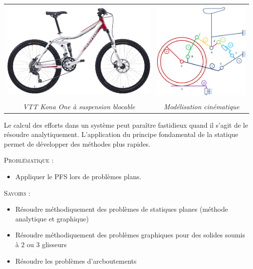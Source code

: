 \documentclass[11pt,oneside]{article}
\begin{document}
\begin{center}
\begin{tabular}{cc}
\includegraphics[height=5cm]{png/vtt1} &
\includegraphics[height=5cm]{png/vtt2} \\
\textit{VTT Kona One à suspension blocable \cite{vtt}} & \textit{Modélisation cinématique}\\
\end{tabular}
\end{center}

\vspace{.2cm}
Le calcul des efforts dans un système peut paraître fastidieux quand il s'agit de le résoudre analytiquement. L'application du principe fondamental de la statique permet de développer des méthodes plus rapides. 

\begin{prob}
\textsc{Problématique :}
\begin{itemize}
\item Appliquer le PFS lors de problèmes plans.
\end{itemize}
\end{prob}

\begin{savoir}
\textsc{Savoirs :}
\begin{itemize}
\item Résoudre méthodiquement des problèmes de statiques planes (méthode analytique et graphique)
\item Résoudre méthodiquement des problèmes graphiques pour des solides soumis à 2 ou 3 glisseurs
\item Résoudre les problèmes d'arcboutements
\end{itemize}
\end{savoir}
\end{document}
